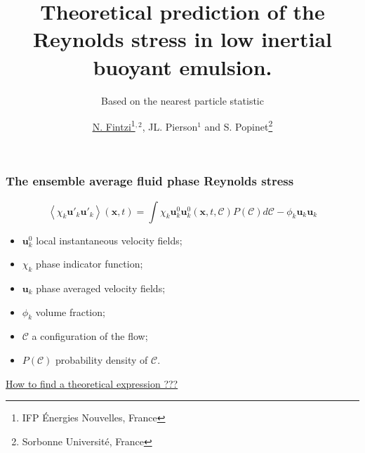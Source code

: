 \documentclass{sintefbeamer}
\title{Theoretical prediction of the Reynolds stress in low inertial buoyant emulsion.}
\subtitle{Based on the nearest particle statistic}
\author{\href{http://basilisk.fr/sandbox/fintzin/Rising-Suspenion/RS.c}{\underline{N. Fintzi}\footnote{IFP \'Energies Nouvelles, France}$^{,2}$}, JL. Pierson$^1$ and S. Popinet\footnote{Sorbonne Universit\'e, France}}
\newcommand{\avg}[1]{\left<#1\right>}
\newcommand{\nstavg}[1]{\overline{#1}^{nst}}
\newcommand{\CC}{\mathscr{C}}
\begin{document}
\maketitle

\begin{frame}
  \frametitle{The ensemble average fluid phase Reynolds stress}
  \begin{equation*}
    \avg{\chi_k \textbf{u}'_k\textbf{u}'_k}(\textbf{x},t)
    = \int  \chi_k \textbf{u}^0_k\textbf{u}^0_k(\textbf{x},t,\CC) P(\CC)d\CC 
    - \phi_k \textbf{u}_k\textbf{u}_k
\end{equation*}

\begin{itemize}
  \item $\textbf{u}_k^0$ local instantaneous velocity fields;
  \item $\chi_k$ phase indicator function;
  \item $\textbf{u}_k$ phase averaged velocity fields;
  \item $\phi_k$ volume fraction;
  \item $\CC$ a configuration of the flow;
  \item $P(\CC)$ probability density of $\CC$.
\end{itemize}


\underline{How to find a theoretical expression ??? }
\end{frame}
\end{document}
